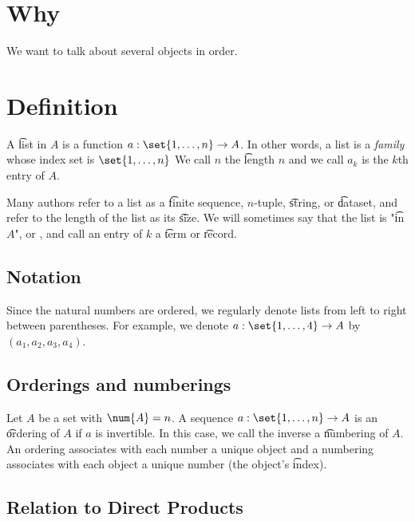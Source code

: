 
\section*{Why}

We want to talk about several objects in order.

\section*{Definition}

A \t{list} in $A$ is a function $a: \set{1, \dots , n} \to A$.
In other words, a list is a \textit{family} whose index set is $\set{1, \dots , n}$
We call $n$ the \t{length} $n$ and we call $a_k$ is the \t{$k$th entry} of $A$.

Many authors refer to a list as a \t{finite sequence}, \t{$n$-tuple}, \t{string}, or \t{dataset}, and refer to the length of the list as its \t{size}.
We will sometimes say that the list is "\t{in} $A$", or , and call an entry of $k$ a \t{term} or \t{record}.

\subsection*{Notation}

Since the natural numbers are ordered, we regularly denote lists from left to right between parentheses.
For example, we denote $a: \set{1, \dots , 4} \to A$ by $(a_1, a_2, a_3, a_4)$.

\subsection*{Orderings and numberings}

Let $A$ be a set with $\num{A} = n$.
A sequence $a: \set{1, \dots , n} \to A$ is an \t{ordering} of $A$ if $a$ is invertible.
In this case, we call the inverse a \t{numbering} of $A$.
An ordering associates with each number a unique object and a numbering associates with each object a unique number (the object's \t{index}).

\subsection*{Relation to Direct Products}

